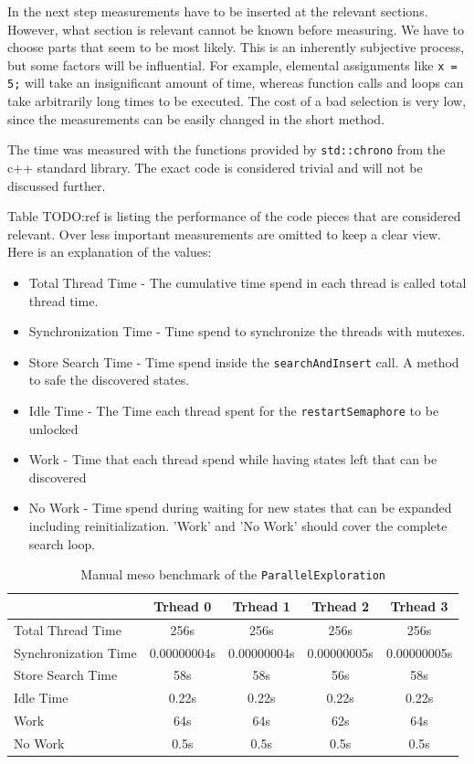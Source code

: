 In the next step measurements have to be inserted at the relevant sections. However, what section is relevant cannot be known before measuring. We have to choose parts that seem to be most likely. This is an inherently subjective process, but some factors will be influential. For example, elemental assignments like \texttt{x = 5;} will take an insignificant amount of time, whereas function calls and loops can take arbitrarily long times to be executed. The cost of a bad selection is very low, since the measurements can be easily changed in the short method.

The time was measured with the functions provided by \texttt{std::chrono} from the c++ standard library. The exact code is considered trivial and will not be discussed further.

Table TODO:ref is listing the performance of the code pieces that are considered relevant. Over less important measurements are omitted to keep a clear view. Here is an explanation of the values:
\begin{itemize}
    \item Total Thread Time - The cumulative time spend in each thread is called total thread time.
    \item Synchronization Time - Time spend to synchronize the threads with mutexes.
    \item Store Search Time - Time spend inside the \texttt{searchAndInsert} call. A method to safe the discovered states.
    \item Idle Time - The Time each thread spent for the \texttt{restartSemaphore} to be unlocked
    \item Work - Time that each thread spend while having states left that can be discovered
    \item No Work - Time spend during waiting for new states that can be expanded including reinitialization. 'Work' and  'No Work' should cover the complete search loop.
\end{itemize}

\begin{center}
    \begin{table}[H]
        \centering
        \begin{tabular}{ | l | c | c | c | c |}
            \hline
            \textbf{} & \textbf{Trhead 0} & \textbf{Trhead 1} & \textbf{Trhead 2} & \textbf{Trhead 3}\\ \hline
            Total Thread Time & 256s & 256s & 256s & 256s \\ 
            Synchronization Time & 0.00000004s & 0.00000004s & 0.00000005s & 0.00000005s \\
            Store Search Time & 58s & 58s & 56s & 58s \\ 
            Idle Time & 0.22s & 0.22s & 0.22s & 0.22s \\ 
            Work & 64s & 64s & 62s & 64s \\ 
            No Work & 0.5s & 0.5s & 0.5s & 0.5s \\ \hline
        \end{tabular}
        \caption{Manual meso benchmark of the \texttt{ParallelExploration}}
    \end{table}
\end{center}

